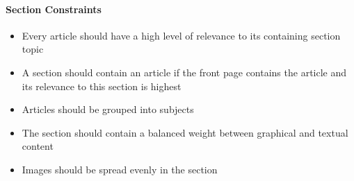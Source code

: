\paragraph{Section Constraints}
\begin{itemize}\itemdist
	\item Every article should have a high level of relevance to its containing section topic
	\item A section should contain an article if the front page contains the article and its relevance to this section is highest
	\item Articles should be grouped into subjects
	\item The section should contain a balanced weight between graphical and textual content
	\item Images should be spread evenly in the section
\end{itemize}
%
